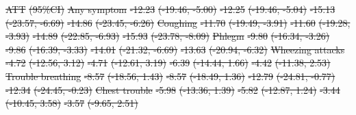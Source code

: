 \documentclass[
  letterpaper,
  DIV=11,
  numbers=noendperiod]{scrartcl}
\makeatletter
\renewenvironment{table}%
   {\renewcommand\familydefault\sfdefault
    \@float{table}}
   {\end@float}
\providecommand{\DIFdel}[1]{{\protect\color{red}\sout{#1}}}                      %
\providecommand{\DIFdelFL}[1]{\DIFdel{#1}} %
\makeatother
\begin{document}
\begin{table}
\DIFdelFL{ATT }%
\DIFdelFL{(95\%CI)}%
\DIFdelFL{Any symptom }%
\DIFdelFL{-12.23 }%
\DIFdelFL{(-19.46, -5.00) }%
\DIFdelFL{-12.25 }%
\DIFdelFL{(-19.46, -5.04) }%
\DIFdelFL{-15.13 }%
\DIFdelFL{(-23.57, -6.69) }%
\DIFdelFL{-14.86 }%
\DIFdelFL{(-23.45, -6.26)}%
\DIFdelFL{Coughing }%
\DIFdelFL{-11.70 }%
\DIFdelFL{(-19.49, -3.91) }%
\DIFdelFL{-11.60 }%
\DIFdelFL{(-19.28, -3.93) }%
\DIFdelFL{-14.89 }%
\DIFdelFL{(-22.85, -6.93) }%
\DIFdelFL{-15.93 }%
\DIFdelFL{(-23.78, -8.09)}%
\DIFdelFL{Phlegm }%
\DIFdelFL{-9.80 }%
\DIFdelFL{(-16.34, -3.26) }%
\DIFdelFL{-9.86 }%
\DIFdelFL{(-16.39, -3.33) }%
\DIFdelFL{-14.01 }%
\DIFdelFL{(-21.32, -6.69) }%
\DIFdelFL{-13.63 }%
\DIFdelFL{(-20.94, -6.32)}%
\DIFdelFL{Wheezing attacks }%
\DIFdelFL{-4.72 }%
\DIFdelFL{(-12.56, 3.12) }%
\DIFdelFL{-4.71 }%
\DIFdelFL{(-12.61, 3.19) }%
\DIFdelFL{-6.39 }%
\DIFdelFL{(-14.44, 1.66) }%
\DIFdelFL{-4.42 }%
\DIFdelFL{(-11.38, 2.53)}%
\DIFdelFL{Trouble breathing }%
\DIFdelFL{-8.57 }%
\DIFdelFL{(-18.56, 1.43) }%
\DIFdelFL{-8.57 }%
\DIFdelFL{(-18.49, 1.36) }%
\DIFdelFL{-12.79 }%
\DIFdelFL{(-24.81, -0.77) }%
\DIFdelFL{-12.34 }%
\DIFdelFL{(-24.45, -0.23)}%
\DIFdelFL{Chest trouble }%
\DIFdelFL{-5.98 }%
\DIFdelFL{(-13.36, 1.39) }%
\DIFdelFL{-5.82 }%
\DIFdelFL{(-12.87, 1.24) }%
\DIFdelFL{-3.44 }%
\DIFdelFL{(-10.45, 3.58) }%
\DIFdelFL{-3.57 }%
\DIFdelFL{(-9.65, 2.51)}%

\end{table}
\end{document}
